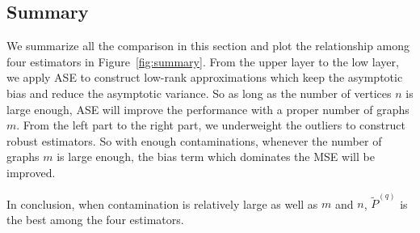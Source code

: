 \documentclass[a4paper]{article}
\begin{document}
\subsection{Summary}
We summarize all the comparison in this section and plot the relationship among four estimators in Figure~\ref{fig:summary}.
From the upper layer to the low layer, we apply ASE to construct low-rank approximations which keep the asymptotic bias and reduce the asymptotic variance. So as long as the number of vertices $n$ is large enough, ASE will improve the performance with a proper number of graphs $m$. From the left part to the right part, we underweight the outliers to construct robust estimators. So with enough contaminations, whenever the number of graphs $m$ is large enough, the bias term which dominates the MSE will be improved.


In conclusion, when contamination is relatively large as well as $m$ and $n$, $\widetilde{P}^{(q)}$ is the best among the four estimators.
\end{document}
